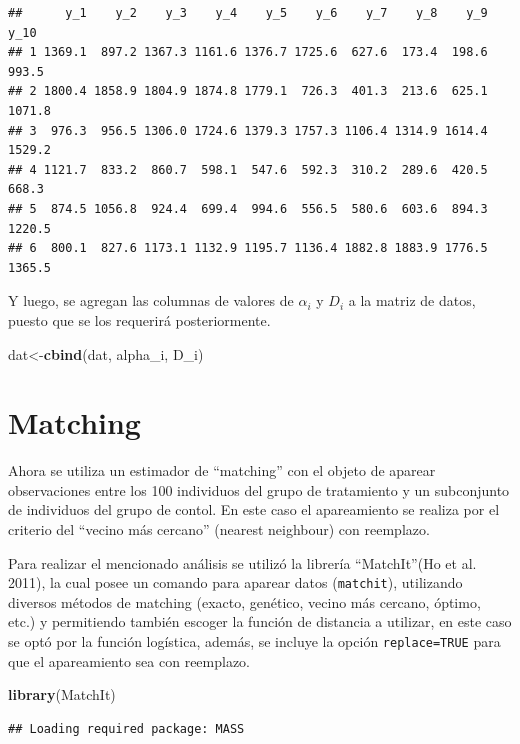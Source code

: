 \documentclass[]{article}
\newenvironment{Shaded}{\begin{snugshade}}{\end{snugshade}}
\newcommand{\KeywordTok}[1]{\textcolor[rgb]{0.13,0.29,0.53}{\textbf{{#1}}}}
\newcommand{\NormalTok}[1]{{#1}}
\begin{document}
\begin{verbatim}
##      y_1    y_2    y_3    y_4    y_5    y_6    y_7    y_8    y_9   y_10
## 1 1369.1  897.2 1367.3 1161.6 1376.7 1725.6  627.6  173.4  198.6  993.5
## 2 1800.4 1858.9 1804.9 1874.8 1779.1  726.3  401.3  213.6  625.1 1071.8
## 3  976.3  956.5 1306.0 1724.6 1379.3 1757.3 1106.4 1314.9 1614.4 1529.2
## 4 1121.7  833.2  860.7  598.1  547.6  592.3  310.2  289.6  420.5  668.3
## 5  874.5 1056.8  924.4  699.4  994.6  556.5  580.6  603.6  894.3 1220.5
## 6  800.1  827.6 1173.1 1132.9 1195.7 1136.4 1882.8 1883.9 1776.5 1365.5
\end{verbatim}

Y luego, se agregan las columnas de valores de $\alpha_{i}$ y $D_{i}$ a
la matriz de datos, puesto que se los requerirá posteriormente.

\begin{Shaded}
\begin{Highlighting}[]
\NormalTok{dat<-}\KeywordTok{cbind}\NormalTok{(dat, alpha_i, D_i)}
\end{Highlighting}
\end{Shaded}

\section{Matching}\label{matching}

Ahora se utiliza un estimador de ``matching'' con el objeto de aparear
observaciones entre los 100 individuos del grupo de tratamiento y un
subconjunto de individuos del grupo de contol. En este caso el
apareamiento se realiza por el criterio del ``vecino más cercano''
(nearest neighbour) con reemplazo.

Para realizar el mencionado análisis se utilizó la librería
``MatchIt''(Ho et al. 2011), la cual posee un comando para aparear datos
(\texttt{matchit}), utilizando diversos métodos de matching (exacto,
genético, vecino más cercano, óptimo, etc.) y permitiendo también
escoger la función de distancia a utilizar, en este caso se optó por la
función logística, además, se incluye la opción \texttt{replace=TRUE}
para que el apareamiento sea con reemplazo.

\begin{Shaded}
\begin{Highlighting}[]
\KeywordTok{library}\NormalTok{(MatchIt)}
\end{Highlighting}
\end{Shaded}

\begin{verbatim}
## Loading required package: MASS
\end{verbatim}
\end{document}
